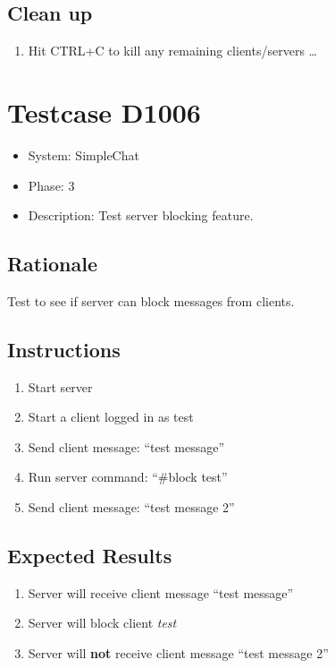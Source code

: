 \documentclass[12pt]{article}
\begin{document}
\subsection*{Clean up}
\begin{enumerate}
\item Hit CTRL+C to kill any remaining clients/servers \dots
\end{enumerate}


\section{Testcase D1006}
\begin{itemize}
\item System: SimpleChat
\item Phase: 3
\item Description: Test server blocking feature.
\end{itemize}

\subsection*{Rationale}
Test to see if server can block messages from clients.

\subsection*{Instructions}
\begin{enumerate}
\item Start server
\item Start a client logged in as test
\item Send client message: ``test message''
\item Run server command: ``\#block test''
\item Send client message: ``test message 2''
\end{enumerate}

\subsection*{Expected Results}
\begin{enumerate}
\item Server will receive client message ``test message''
\item Server will block client \emph{test}
\item Server will \textbf{not} receive client message ``test message 2''
\end{enumerate}
\end{document}
